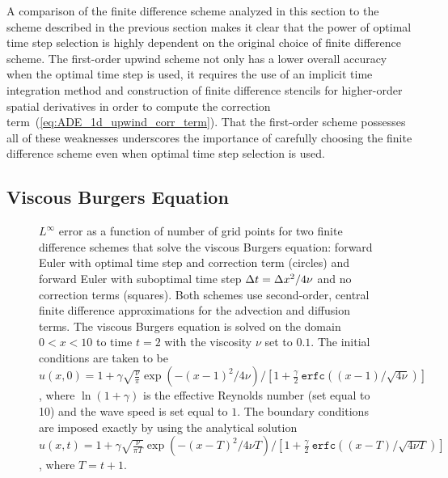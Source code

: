 \documentclass[oneeqnum,onefignum,onetabnum,onethmnum]{siamltex}
\begin{document}
A comparison of the finite difference scheme analyzed in this section to the 
scheme described in the previous section makes it clear that the power 
of optimal time step selection is highly dependent on the original choice of 
finite difference scheme.  The first-order upwind scheme not only has a 
lower overall accuracy when the optimal time step is used, it requires the 
use of an implicit time integration method and construction of finite 
difference stencils for higher-order spatial derivatives in order to compute
the correction term~(\ref{eq:ADE_1d_upwind_corr_term}).  That the first-order
scheme possesses all of these weaknesses underscores the importance of 
carefully choosing the finite difference scheme even when optimal time step 
selection is used.  


\subsection{Viscous Burgers Equation}
\begin{figure}[tb]
\begin{center}
\caption{$L^\infty$ error as a function of number of grid points for
two finite difference schemes that solve the viscous Burgers equation:
forward Euler with optimal time step and correction term (circles)
and forward Euler with suboptimal time step $\Delta t = \Delta x^2/4\nu$ and no 
correction terms (squares).
Both schemes use second-order, central finite difference approximations for
the advection and diffusion terms.
The viscous Burgers equation is solved on the domain $0 < x < 10$ to 
time $t=2$ with the viscosity $\nu$ set to $0.1$.  The initial conditions are 
taken to be 
$u(x,0) = 1 + \gamma \sqrt{\frac{\nu}{\pi}} \exp\left( -(x-1)^2/4 \nu \right) 
            / \left[ 1 + \frac{\gamma}{2} \ 
                         \mathtt{erfc}\left((x-1)/\sqrt{4\nu} \right) 
    \right]$,
where $\ln(1+\gamma)$ is the effective Reynolds number (set equal to 10) and 
the wave speed is set equal to $1$.  The boundary conditions are imposed 
exactly by using
the analytical solution
$u(x,t) = 1 + \gamma \sqrt{\frac{\nu}{\pi T}} 
              \exp\left( -(x-T)^2/4 \nu T \right) 
            / \left[ 1 + \frac{\gamma}{2} \ 
                         \mathtt{erfc}\left((x-T)/\sqrt{4\nu T} \right) 
    \right]$,
where $T = t+1$.
}
\label{fig:burgers_1d_error}
\end{center}
\end{figure}
\end{document}
